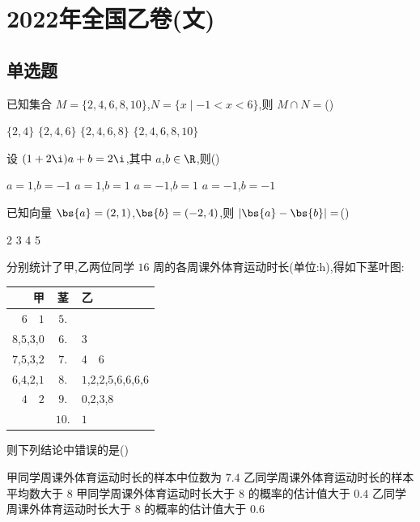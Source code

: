 \chapter{2022年全国乙卷(文)}
\section{单选题}

\begin{problem}
已知集合 \(M=\{2,4,6,8,10\}\),\(N=\{x\mid -1<x<6\}\),则 \(M\cap N=\)(\quad)

\choices
    {\(\{2,4\}\)}
    {\(\{2,4,6\}\)}
    {\(\{2,4,6,8\}\)}
    {\(\{2,4,6,8,10\}\)}
\end{problem}

\begin{problem}
设 \((1+2\i)a+b=2\i\),其中 \(a\),\(b\in\R\),则(\quad)

\choices
    {\(a=1\),\(b=-1\)}
    {\(a=1\),\(b=1\)}
    {\(a=-1\),\(b=1\)}
    {\(a=-1\),\(b=-1\)}
\end{problem}

\begin{problem}
已知向量 \(\bs{a}=(2,1)\),\(\bs{b}=(-2,4)\),则 \(\left|\bs{a}-\bs{b}\right|=\)(\quad)

\choices
    {2}
    {3}
    {4}
    {5}
\end{problem}

\begin{problem}
分别统计了甲,乙两位同学 \(16\) 周的各周课外体育运动时长(单位:h),得如下茎叶图:

\begin{center}
\begin{tabular}{r|c|l}
甲 & 茎 & 乙 \\
\hline
\(6\quad1\) & \(5\). & \\
\(8\),\(5\),\(3\),\(0\) & \(6\). & \(3\) \\
\(7\),\(5\),\(3\),\(2\) & \(7\). & \(4\quad6\) \\
\(6\),\(4\),\(2\),\(1\) & \(8\). & \(1\),\(2\),\(2\),\(5\),\(6\),\(6\),\(6\),\(6\) \\
\(4\quad2\) & \(9\). & \(0\),\(2\),\(3\),\(8\) \\
 & \(10\). & \(1\)
\end{tabular}
\end{center}

则下列结论中错误的是(\quad)

\choices
    {甲同学周课外体育运动时长的样本中位数为 \(7.4\)}
    {乙同学周课外体育运动时长的样本平均数大于 \(8\)}
    {甲同学周课外体育运动时长大于 \(8\) 的概率的估计值大于 \(0.4\)}
    {乙同学周课外体育运动时长大于 \(8\) 的概率的估计值大于 \(0.6\)}
\end{problem}


